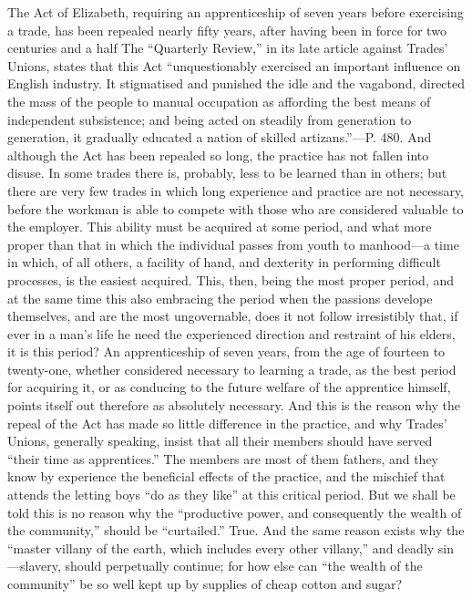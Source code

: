 The Act of Elizabeth, requiring an apprenticeship of seven years before
exercising a trade, has been repealed nearly fifty years, after having
been in force for two centuries and a half The ``Quarterly Review,'' in
its late article against Trades' Unions, states that this Act
``unquestionably exercised an important influence on English industry.
It stigmatised and punished the idle and the vagabond, directed the mass
of the people to manual occupation as affording the best means of
independent subsistence; and being acted on steadily from generation to
generation, it gradually educated a nation of skilled artizans.''---P.
480. And although the Act has been repealed so long, the practice has
not fallen into disuse. In some trades there is, probably, less to be
learned than in others; but there are very few trades in which long
experience and practice are not necessary, before the workman is able to
compete with those who are considered valuable to the employer. This
ability must be acquired at some period, and what more proper than that
in which the individual passes from youth to manhood---a time in which,
of all others, a facility of hand, and dexterity in performing difficult
processes, is the easiest acquired. This, then, being the most proper
period, and at the same time this also embracing the period when the
passions develope themselves, and are the most ungovernable, does it not
follow irresistibly that, if ever in a man's life he need the
experienced direction and restraint of his elders, it is this period? An
apprenticeship of seven years, from the age of fourteen to twenty-one,
whether considered necessary to learning a trade, as the best period for
acquiring it, or as conducing to the future welfare of the apprentice
himself, points itself out therefore as absolutely necessary. And this
is the reason why the repeal of the Act has made so little difference in
the practice, and why Trades' Unions, generally speaking, insist that
all their members should have served ``their time as apprentices.'' The
members are most of them fathers, and they know by experience the
beneficial effects of the practice, and the mischief that attends the
letting boys ``do as they like'' at this critical period. But we shall
be told this is no reason why the ``productive power, and consequently
the wealth of the community,'' should be ``curtailed.'' True. And the
same reason exists why the ``master villany of the earth, which includes
every other villany,'' and deadly sin---slavery, should perpetually
continue; for how else can ``the wealth of the community'' be so well
kept up by supplies of cheap cotton and sugar?

